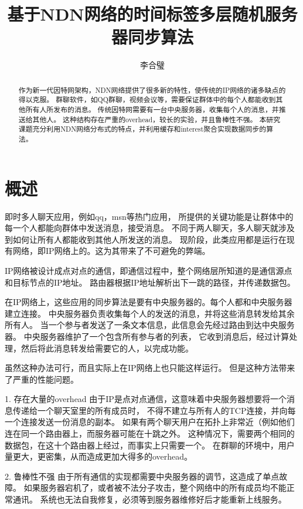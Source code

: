 \documentclass[a4paper]{article}
\author{李合璧}
\begin{document}
\title{基于NDN网络的时间标签多层随机服务器同步算法}


\maketitle


\begin{abstract}
作为新一代因特网架构，NDN网络提供了很多新的特性，使传统的IP网络的诸多缺点的得以克服。
群聊软件，如QQ群聊，视频会议等，需要保证群体中的每个人都能收到其他所有人所发布的消息。
传统因特网需要有一台中央服务器，收集每个人的消息，并推送给其他人。
这种结构存在严重的overhead，较长的实验，并且鲁棒性不强。
本研究课题充分利用NDN网络分布式的特点，并利用缓存和interest聚合实现数据同步的算法。
\end{abstract}

\section{概述}

即时多人聊天应用，例如qq，msn等热门应用，
所提供的关键功能是让群体中的每一个人都能向群体中发送消息，接受消息。
不同于两人聊天，多人聊天就涉及到如何让所有人都能收到其他人所发送的消息。
现阶段，此类应用都是运行在现有网络，即IP网络上的。这为其带来了不可避免的弊端。

IP网络被设计成点对点的通信，即通信过程中，整个网络层所知道的是通信源点和目标节点的IP地址。
路由器根据IP地址解析出下一跳的路径，并传递数据包。

在IP网络上，这些应用的同步算法是要有中央服务器的。每个人都和中央服务器建立连接。
中央服务器负责收集每个人的发送的消息，并将这些消息转发给其余所有人。
当一个参与者发送了一条文本信息，此信息会先经过路由到达中央服务器。
中央服务器维护了一个包含所有参与者的列表，
它收到消息后，经过计算处理，然后将此消息转发给需要它的人，以完成功能。

虽然这种办法可行，而且实际上在IP网络上也只能这样运行。
但是这种方法带来了严重的性能问题。

1. 存在大量的overhead
由于IP是点对点通信，这意味着中央服务器想要将一个消息传递给一个聊天室里的所有成员时，
不得不建立与所有人的TCP连接，并向每一个连接发送一份消息的副本。
如果有两个聊天用户在拓扑上非常近（例如他们连在同一个路由器上，而服务器可能在十跳之外。
这种情况下，需要两个相同的数据包，在这十个路由器上经过，而事实上只需要一个。
在群聊的环境中，用户量更大，更密集，从而造成更加大得多的overhead。

2. 鲁棒性不强
由于所有通信的实现都需要中央服务器的调节，这造成了单点故障。
如果服务器宕机了，或者被不法分子攻击，整个网络中的所有成员均不能正常通讯。
系统也无法自我修复，必须等到服务器维修好后才能重新上线服务。
\end{document}

